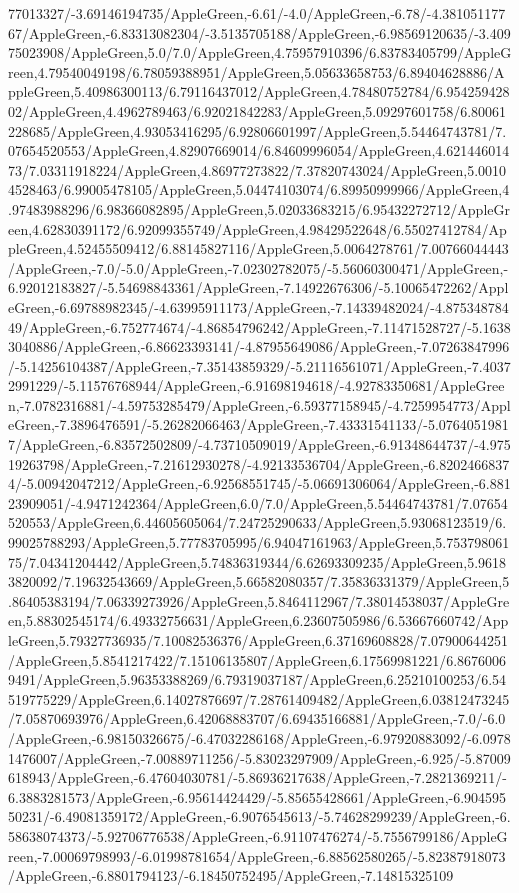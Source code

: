 {\begin{tikzternal}
77013327/-3.69146194735/AppleGreen,-6.61/-4.0/AppleGreen,-6.78/-4.38105117767/AppleGreen,-6.83313082304/-3.5135705188/AppleGreen,-6.98569120635/-3.40975023908/AppleGreen,5.0/7.0/AppleGreen,4.75957910396/6.83783405799/AppleGreen,4.79540049198/6.78059388951/AppleGreen,5.05633658753/6.89404628886/AppleGreen,5.40986300113/6.79116437012/AppleGreen,4.78480752784/6.95425942802/AppleGreen,4.4962789463/6.92021842283/AppleGreen,5.09297601758/6.80061228685/AppleGreen,4.93053416295/6.92806601997/AppleGreen,5.54464743781/7.07654520553/AppleGreen,4.82907669014/6.84609996054/AppleGreen,4.62144601473/7.03311918224/AppleGreen,4.86977273822/7.37820743024/AppleGreen,5.00104528463/6.99005478105/AppleGreen,5.04474103074/6.89950999966/AppleGreen,4.97483988296/6.98366082895/AppleGreen,5.02033683215/6.95432272712/AppleGreen,4.62830391172/6.92099355749/AppleGreen,4.98429522648/6.55027412784/AppleGreen,4.52455509412/6.88145827116/AppleGreen,5.0064278761/7.00766044443/AppleGreen,-7.0/-5.0/AppleGreen,-7.02302782075/-5.56060300471/AppleGreen,-6.92012183827/-5.54698843361/AppleGreen,-7.14922676306/-5.10065472262/AppleGreen,-6.69788982345/-4.63995911173/AppleGreen,-7.14339482024/-4.87534878449/AppleGreen,-6.752774674/-4.86854796242/AppleGreen,-7.11471528727/-5.16383040886/AppleGreen,-6.86623393141/-4.87955649086/AppleGreen,-7.07263847996/-5.14256104387/AppleGreen,-7.35143859329/-5.21116561071/AppleGreen,-7.40372991229/-5.11576768944/AppleGreen,-6.91698194618/-4.92783350681/AppleGreen,-7.0782316881/-4.59753285479/AppleGreen,-6.59377158945/-4.7259954773/AppleGreen,-7.3896476591/-5.26282066463/AppleGreen,-7.43331541133/-5.07640519817/AppleGreen,-6.83572502809/-4.73710509019/AppleGreen,-6.91348644737/-4.97519263798/AppleGreen,-7.21612930278/-4.92133536704/AppleGreen,-6.82024668374/-5.00942047212/AppleGreen,-6.92568551745/-5.06691306064/AppleGreen,-6.88123909051/-4.9471242364/AppleGreen,6.0/7.0/AppleGreen,5.54464743781/7.07654520553/AppleGreen,6.44605605064/7.24725290633/AppleGreen,5.93068123519/6.99025788293/AppleGreen,5.77783705995/6.94047161963/AppleGreen,5.75379806175/7.04341204442/AppleGreen,5.74836319344/6.62693309235/AppleGreen,5.96183820092/7.19632543669/AppleGreen,5.66582080357/7.35836331379/AppleGreen,5.86405383194/7.06339273926/AppleGreen,5.8464112967/7.38014538037/AppleGreen,5.88302545174/6.49332756631/AppleGreen,6.23607505986/6.53667660742/AppleGreen,5.79327736935/7.10082536376/AppleGreen,6.37169608828/7.07900644251/AppleGreen,5.8541217422/7.15106135807/AppleGreen,6.17569981221/6.86760069491/AppleGreen,5.96353388269/6.79319037187/AppleGreen,6.25210100253/6.54519775229/AppleGreen,6.14027876697/7.28761409482/AppleGreen,6.03812473245/7.05870693976/AppleGreen,6.42068883707/6.69435166881/AppleGreen,-7.0/-6.0/AppleGreen,-6.98150326675/-6.47032286168/AppleGreen,-6.97920883092/-6.09781476007/AppleGreen,-7.00889711256/-5.83023297909/AppleGreen,-6.925/-5.87009618943/AppleGreen,-6.47604030781/-5.86936217638/AppleGreen,-7.2821369211/-6.3883281573/AppleGreen,-6.95614424429/-5.85655428661/AppleGreen,-6.90459550231/-6.49081359172/AppleGreen,-6.9076545613/-5.74628299239/AppleGreen,-6.58638074373/-5.92706776538/AppleGreen,-6.91107476274/-5.7556799186/AppleGreen,-7.00069798993/-6.01998781654/AppleGreen,-6.88562580265/-5.82387918073/AppleGreen,-6.8801794123/-6.18450752495/AppleGreen,-7.14815325109
\end{tikzternal}}
